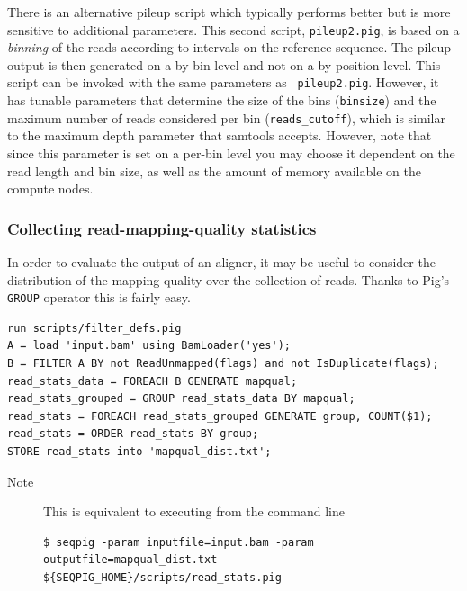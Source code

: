 There is an alternative pileup script which typically performs better
but is more sensitive to additional parameters. This second script,
{\tt pileup2.pig}, is based on a \emph{binning} of the reads according
to intervals on the reference sequence. The pileup output is then
generated on a by-bin level and not on a by-position level. This
script can be invoked with the same parameters as {\tt
  pileup2.pig}. However, it has tunable parameters that determine the
size of the bins ({\tt binsize}) and the maximum number of reads
considered per bin ({\tt reads\_cutoff}), which is similar to the
maximum depth parameter that samtools accepts. However, note that
since this parameter is set on a per-bin level you may choose it
dependent on the read length and bin size, as well as the amount of
memory available on the compute nodes.

\subsubsection{Collecting read-mapping-quality statistics}
In order to evaluate the output of an aligner, it may be useful to
consider the distribution of the mapping quality over the collection of
reads. Thanks to Pig's {\tt GROUP} operator this is fairly easy.
\begin{lstlisting}
run scripts/filter_defs.pig
A = load 'input.bam' using BamLoader('yes');
B = FILTER A BY not ReadUnmapped(flags) and not IsDuplicate(flags);
read_stats_data = FOREACH B GENERATE mapqual;
read_stats_grouped = GROUP read_stats_data BY mapqual;
read_stats = FOREACH read_stats_grouped GENERATE group, COUNT($1);
read_stats = ORDER read_stats BY group;
STORE read_stats into 'mapqual_dist.txt';
\end{lstlisting}
\begin{description}
	\item[Note] This is equivalent to executing from the command line
\begin{lstlisting}
$ seqpig -param inputfile=input.bam -param outputfile=mapqual_dist.txt ${SEQPIG_HOME}/scripts/read_stats.pig
\end{lstlisting}
\end{description}

